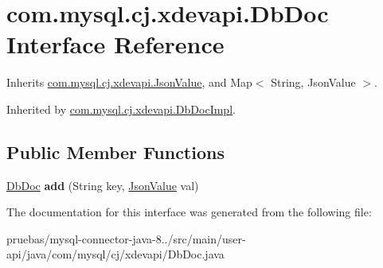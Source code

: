 \hypertarget{interfacecom_1_1mysql_1_1cj_1_1xdevapi_1_1_db_doc}{}\section{com.\+mysql.\+cj.\+xdevapi.\+Db\+Doc Interface Reference}
\label{interfacecom_1_1mysql_1_1cj_1_1xdevapi_1_1_db_doc}


Inherits \mbox{\hyperlink{interfacecom_1_1mysql_1_1cj_1_1xdevapi_1_1_json_value}{com.\+mysql.\+cj.\+xdevapi.\+Json\+Value}}, and Map$<$ String, Json\+Value $>$.



Inherited by \mbox{\hyperlink{classcom_1_1mysql_1_1cj_1_1xdevapi_1_1_db_doc_impl}{com.\+mysql.\+cj.\+xdevapi.\+Db\+Doc\+Impl}}.

\subsection*{Public Member Functions}
\begin{DoxyCompactItemize}
\item 
\mbox{\label{interfacecom_1_1mysql_1_1cj_1_1xdevapi_1_1_db_doc_a49318fdc8c741c373d2cae74292bb29d}} 
\mbox{\hyperlink{interfacecom_1_1mysql_1_1cj_1_1xdevapi_1_1_db_doc}{Db\+Doc}} {\bfseries add} (String key, \mbox{\hyperlink{interfacecom_1_1mysql_1_1cj_1_1xdevapi_1_1_json_value}{Json\+Value}} val)
\end{DoxyCompactItemize}


The documentation for this interface was generated from the following file\+:\begin{DoxyCompactItemize}
\item 
pruebas/mysql-\/connector-\/java-\/8../src/main/user-\/api/java/com/mysql/cj/xdevapi/Db\+Doc.\+java\end{DoxyCompactItemize}
